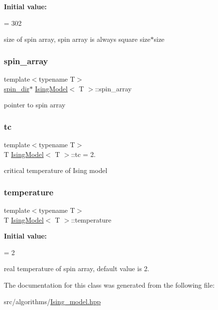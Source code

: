 {\bfseries Initial value\+:}
\begin{DoxyCode}
=
        302
\end{DoxyCode}
size of spin array, spin array is always square size$\ast$size \mbox{\label{classIsingModel_a82425f60fa2dd07995c2a53f8a850cf5}} 
\subsubsection{\texorpdfstring{spin\+\_\+array}{spin\_array}}
{\footnotesize\ttfamily template$<$typename T$>$ \\
\mbox{\hyperlink{classspin__dir}{spin\+\_\+dir}}$\ast$ \mbox{\hyperlink{classIsingModel}{Ising\+Model}}$<$ T $>$\+::spin\+\_\+array\hspace{0.3cm}{\ttfamily [private]}}

pointer to spin array \mbox{\label{classIsingModel_af19ba376c01404c094c214939eafd7a5}} 
\subsubsection{\texorpdfstring{tc}{tc}}
{\footnotesize\ttfamily template$<$typename T$>$ \\
T \mbox{\hyperlink{classIsingModel}{Ising\+Model}}$<$ T $>$\+::tc = 2.\hspace{0.3cm}{\ttfamily [private]}}

critical temperature of Ising model \mbox{\label{classIsingModel_a756faa94432cc7e10d21e52a03156569}} 
\subsubsection{\texorpdfstring{temperature}{temperature}}
{\footnotesize\ttfamily template$<$typename T$>$ \\
T \mbox{\hyperlink{classIsingModel}{Ising\+Model}}$<$ T $>$\+::temperature\hspace{0.3cm}{\ttfamily [private]}}

{\bfseries Initial value\+:}
\begin{DoxyCode}
=
        2
\end{DoxyCode}
real temperature of spin array, default value is 2. 

The documentation for this class was generated from the following file\+:\begin{DoxyCompactItemize}
\item 
src/algorithms/\mbox{\hyperlink{Ising__model_8hpp}{Ising\+\_\+model.\+hpp}}\end{DoxyCompactItemize}
